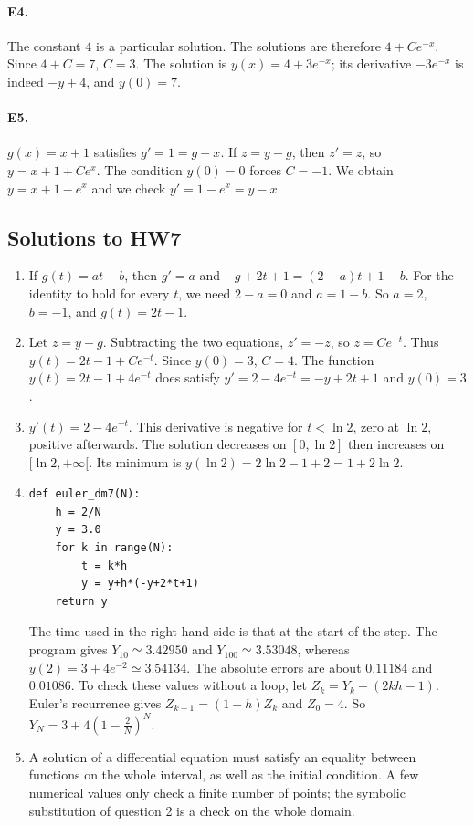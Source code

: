 \paragraph{E4.}The constant $4$ is a particular solution. The solutions are therefore $4+Ce^{-x}$. Since $4+C=7$, $C=3$. The solution is $y(x)=4+3e^{-x}$; its derivative $-3e^{-x}$ is indeed $-y+4$, and $y(0)=7$.

\paragraph{E5.}$g(x)=x+1$ satisfies $g'=1=g-x$. If $z=y-g$, then $z'=z$, so $y=x+1+Ce^x$. The condition $y(0)=0$ forces $C=-1$. We obtain $y=x+1-e^x$ and we check $y'=1-e^x=y-x$.

\subsection{Solutions to HW7}\begin{enumerate}
\item If $g(t)=at+b$, then $g'=a$ and $-g+2t+1=(2-a)t+1-b$. For the identity to hold for every $t$, we need $2-a=0$ and $a=1-b$. So $a=2$, $b=-1$, and $g(t)=2t-1$.
\item Let $z=y-g$. Subtracting the two equations, $z'=-z$, so $z=Ce^{-t}$. Thus $y(t)=2t-1+Ce^{-t}$. Since $y(0)=3$, $C=4$. The function $y(t)=2t-1+4e^{-t}$ does satisfy $y'=2-4e^{-t}=-y+2t+1$ and $y(0)=3$.
\item $y'(t)=2-4e^{-t}$. This derivative is negative for $t<\ln2$, zero at $\ln2$, positive afterwards. The solution decreases on $[0,\ln2]$ then increases on $[\ln2,+\infty[$. Its minimum is $y(\ln2)=2\ln2-1+2=1+2\ln2$.
\item 
\begin{lstlisting}
def euler_dm7(N):
    h = 2/N
    y = 3.0
    for k in range(N):
        t = k*h
        y = y+h*(-y+2*t+1)
    return y
\end{lstlisting}
The time used in the right-hand side is that at the start of the step. The program gives $Y_{10}\simeq\num{3,42950}$ and $Y_{100}\simeq\num{3,53048}$, whereas $y(2)=3+4e^{-2}\simeq\num{3,54134}$. The absolute errors are about $\num{0,11184}$ and $\num{0,01086}$.
To check these values without a loop, let $Z_k=Y_k-(2kh-1)$. Euler's recurrence gives $Z_{k+1}=(1-h)Z_k$ and $Z_0=4$. So $Y_N=3+4(1-\frac{2}{N})^N$.
\item A solution of a differential equation must satisfy an equality between functions on the whole interval, as well as the initial condition. A few numerical values only check a finite number of points; the symbolic substitution of question 2 is a check on the whole domain.
\end{enumerate}

